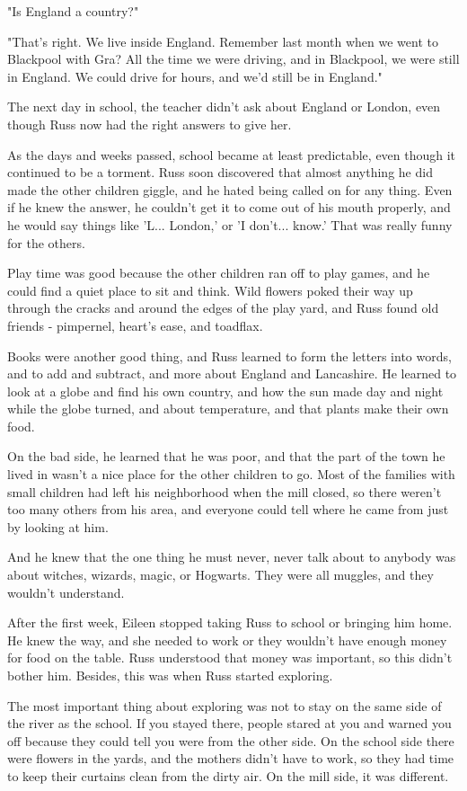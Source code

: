 \documentclass[a4paper,11pt]{article}
\begin{document}
"Is England a country?"

"That's right. We live inside England. Remember last month when we went to Blackpool with Gra? All the time we were driving, and in Blackpool, we were still in England. We could drive for hours, and we'd still be in England."

The next day in school, the teacher didn't ask about England or London, even though Russ now had the right answers to give her.

As the days and weeks passed, school became at least predictable, even though it continued to be a torment. Russ soon discovered that almost anything he did made the other children giggle, and he hated being called on for any thing. Even if he knew the answer, he couldn't get it to come out of his mouth properly, and he would say things like 'L... London,' or 'I don't... know.' That was really funny for the others.

Play time was good because the other children ran off to play games, and he could find a quiet place to sit and think. Wild flowers poked their way up through the cracks and around the edges of the play yard, and Russ found old friends - pimpernel, heart's ease, and toadflax.

Books were another good thing, and Russ learned to form the letters into words, and to add and subtract, and more about England and Lancashire. He learned to look at a globe and find his own country, and how the sun made day and night while the globe turned, and about temperature, and that plants make their own food.

On the bad side, he learned that he was poor, and that the part of the town he lived in wasn't a nice place for the other children to go. Most of the families with small children had left his neighborhood when the mill closed, so there weren't too many others from his area, and everyone could tell where he came from just by looking at him.

And he knew that the one thing he must never, never talk about to anybody was about witches, wizards, magic, or Hogwarts. They were all muggles, and they wouldn't understand.

After the first week, Eileen stopped taking Russ to school or bringing him home. He knew the way, and she needed to work or they wouldn't have enough money for food on the table. Russ understood that money was important, so this didn't bother him. Besides, this was when Russ started exploring.

The most important thing about exploring was not to stay on the same side of the river as the school. If you stayed there, people stared at you and warned you off because they could tell you were from the other side. On the school side there were flowers in the yards, and the mothers didn't have to work, so they had time to keep their curtains clean from the dirty air. On the mill side, it was different.
\end{document}
